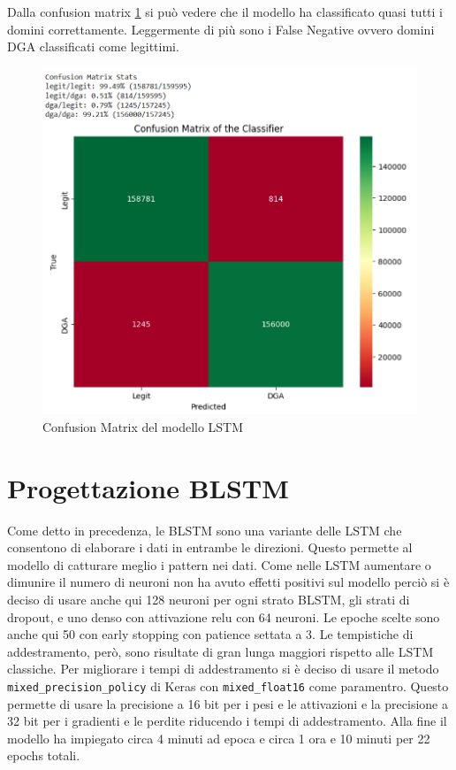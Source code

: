 \documentclass[12pt,a4paper,openright,twoside]{book}
\begin{document}
\noindent Dalla confusion matrix \ref{fig:LSTM confusion matrix} si può vedere che il modello ha classificato quasi tutti 
i domini correttamente. Leggermente di più sono i
False Negative ovvero domini DGA classificati come legittimi.
\begin{figure}[H]
    \centering
    \includegraphics[width=.8\linewidth]{figures/LSTM conf_matr.png}
    \caption{Confusion Matrix del modello LSTM}
    \label{fig:LSTM confusion matrix}
\end{figure}

\section{Progettazione BLSTM}

Come detto in precedenza, le BLSTM sono una variante delle LSTM che
consentono di elaborare i dati in entrambe le direzioni.
Questo permette al modello di catturare meglio
i pattern nei dati.
Come nelle LSTM aumentare o dimunire il numero di neuroni
non ha avuto effetti positivi sul modello perciò si è deciso di usare anche qui
128 neuroni per ogni strato BLSTM, gli strati di dropout, e uno denso con attivazione relu con 64 neuroni.
Le epoche scelte sono anche qui 50 con early stopping con patience settata a 3.
Le tempistiche di addestramento, però, sono risultate di gran lunga
maggiori rispetto alle LSTM classiche.
Per migliorare i tempi di addestramento si è deciso di usare il metodo \texttt{mixed\_precision\_policy} di Keras
con \texttt{mixed\_float16} come paramentro. Questo permette di usare
la precisione a 16 bit per i pesi e le attivazioni
e la precisione a 32 bit per i gradienti e le perdite riducendo i tempi di addestramento.
Alla fine il modello ha impiegato circa 4 minuti ad epoca e circa 1 ora e 10 minuti per 22 epochs totali.
\end{document}
